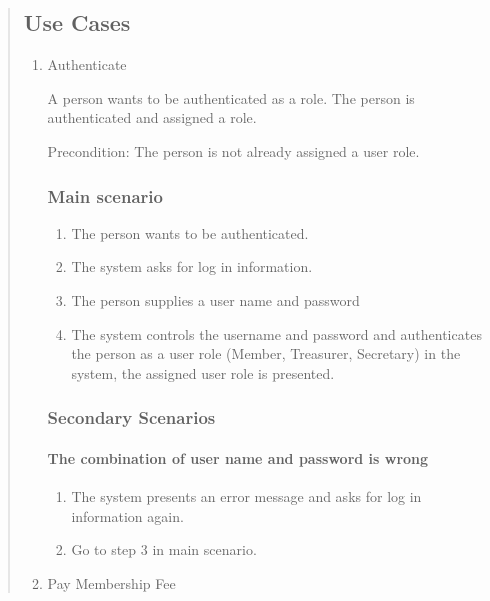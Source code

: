 \begin{quote}
\subsection{Use Cases}\label{use-cases}

\begin{enumerate}
  \item
  Authenticate
  
  A person wants to be authenticated as a role. The person is authenticated and assigned a role.
  
  Precondition: The person is not already assigned a user role.
  
  \subsubsection*{Main scenario}
  \begin{enumerate}
  \tightlist
  \item
    The person wants to be authenticated.
  \item
    The system asks for log in information.
  \item
    The person supplies a user name and password
  \item
    The system controls the username and password and authenticates the
    person as a user role (Member, Treasurer, Secretary) in the system,
    the assigned user role is presented.
  \end{enumerate}
  
  \subsubsection*{Secondary Scenarios}
  \paragraph{The combination of user name and password is wrong}
  \begin{enumerate}
    \tightlist
    \item
      The system presents an error message and asks for log in information
      again.
    \item
      Go to step 3 in main scenario.
  \end{enumerate}


  \item
  Pay Membership Fee
  

\end{enumerate}
\end{quote}
